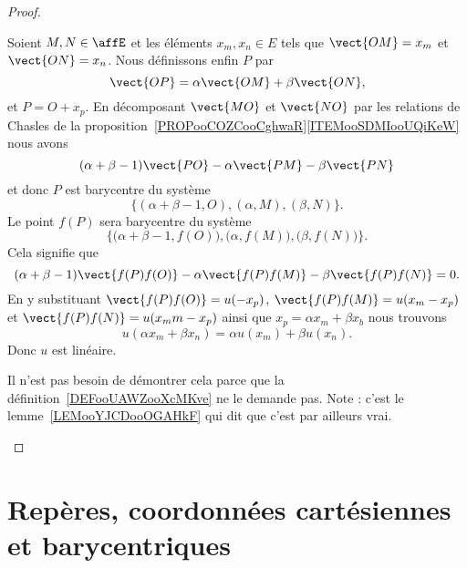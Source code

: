 \begin{proof}
\begin{subproof}
\begin{subproof}
			Soient \( M,N\in\affE\) et les éléments \( x_m,x_n\in E\) tels que \( \vect{ OM }=x_m\) et \( \vect{ ON }=x_n\). Nous définissons enfin \( P\) par
			\begin{equation}
				\vect{ OP }=\alpha \vect{ OM }+\beta\vect{ ON },
			\end{equation}
			et \( P=O+x_p\). En décomposant \( \vect{ MO }\) et \( \vect{ NO }\) par les relations de Chasles de la proposition~\ref{PROPooCOZCooCghwaR}\ref{ITEMooSDMIooUQiKeW} nous avons
			\begin{equation}
				(\alpha+\beta-1)\vect{ PO }-\alpha\vect{ PM }-\beta\vect{ PN }
			\end{equation}
			et donc \( P\) est barycentre du système
			\begin{equation}
				\big\{ (\alpha+\beta-1,O),(\alpha,M),(\beta,N) \}.
			\end{equation}
			Le point \( f(P)\) sera barycentre du système
			\begin{equation}
				\Big\{ \big( \alpha+\beta-1,f(O) \big),\big( \alpha,f(M) \big), \big( \beta,f(N) \big) \}.
			\end{equation}
			Cela signifie que
			\begin{equation}
				(\alpha+\beta-1)\vect{ f(P)f(O) }-\alpha\vect{ f(P)f(M) }-\beta\vect{ f(P)f(N) }=0.
			\end{equation}
			En y substituant \( \vect{ f(P)f(O) }=u(-x_p)\), \( \vect{ f(P)f(M) }=u(x_m-x_p)\) et \( \vect{ f(P)f(N) }=u(x_mm-x_p)\) ainsi que \( x_p=\alpha x_m+\beta x_b\) nous trouvons
			\begin{equation}
				u(\alpha x_m+\beta x_n)=\alpha u(x_m)+\beta u(x_n).
			\end{equation}
			Donc \( u\) est linéaire.


			Il n'est pas besoin de démontrer cela parce que la définition~\ref{DEFooUAWZooXcMKve} ne le demande pas. Note : c'est le lemme~\ref{LEMooYJCDooOGAHkF} qui dit que c'est par ailleurs vrai.
		\end{subproof}
	\end{subproof}
\end{proof}

\section{Repères, coordonnées cartésiennes et barycentriques}

